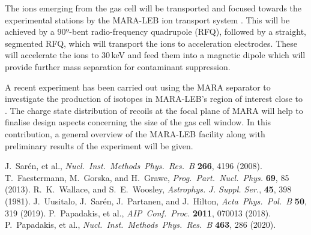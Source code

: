 \documentclass[12pt, a4paper]{article}
\begin{document}
The ions emerging from the gas cell will be transported and focused towards the experimental stations by the MARA-LEB ion transport system \cite{ion}. This will be achieved by a 90º-bent radio-frequency quadrupole (RFQ), followed by a straight, segmented RFQ, which will transport the ions to acceleration electrodes. These will accelerate the ions to 30\,keV and feed them into a magnetic dipole which will provide further mass separation for contaminant suppression. 

A recent experiment has been carried out using the MARA separator to investigate the production of isotopes in MARA-LEB's region of interest close to . The charge state distribution of  recoils at the focal plane of MARA will help to finalise design aspects concerning the size of the gas cell window. In this contribution, a general overview of the MARA-LEB facility along with preliminary results of the experiment will be given.






\vspace{2\baselineskip}

\begin{thebibliography}{9}
 J.~Sarén, et al., {\it Nucl.~Inst.~Methods~Phys.~Res.~B} {\bf 266}, 4196 (2008). 
 T.~Faestermann, M.~Gorska, and H.~Grawe, {\it Prog.~Part.~Nucl.~Phys.} \textbf{69}, 85 (2013).
 R.~K.~Wallace, and S.~E.~Woosley, {\it
Astrophys. J. Suppl. Ser.}, \textbf{45}, 398 (1981).
 J.~Uusitalo, J.~Sarén, J.~Partanen, and J.~Hilton, {\it Acta~Phys.~Pol.~B} {\bf 50}, 319 (2019).
 P.~Papadakis, et al., {\it AIP~Conf.~Proc.} \textbf{2011}, 070013 (2018).
 P.~Papadakis, et al., {\it Nucl.~Inst.~Methods~Phys.~Res.~B} \textbf{463}, 286 (2020).
\end{thebibliography}
\end{document}
